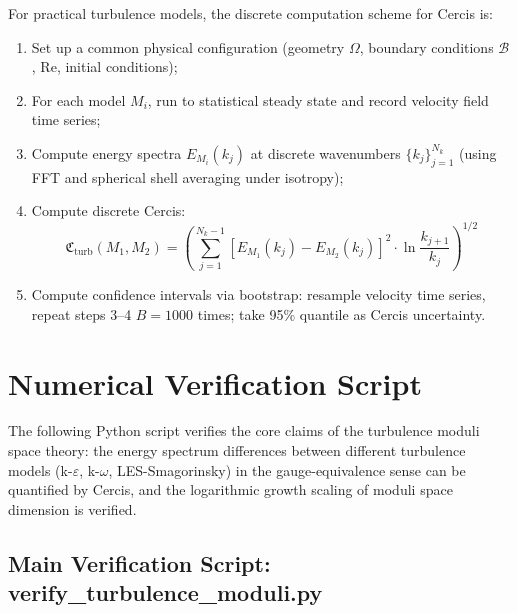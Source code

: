 \documentclass[12pt,a4paper]{article}
\theoremstyle{plain}
\theoremstyle{definition}
\theoremstyle{remark}
\newcommand{\cercis}{\mathfrak{C}}
\newcommand{\ReNum}{\mathrm{Re}}
\newcommand{\eps}{\varepsilon}
\begin{document}
For practical turbulence models, the discrete computation scheme for Cercis is:

\begin{enumerate}
    \item Set up a common physical configuration (geometry $\Omega$, boundary conditions $\mathcal{B}$, $\ReNum$, initial conditions);
    
    \item For each model $M_i$, run to statistical steady state and record velocity field time series;
    
    \item Compute energy spectra $E_{M_i}(k_j)$ at discrete wavenumbers $\{k_j\}_{j=1}^{N_k}$ (using FFT and spherical shell averaging under isotropy);
    
    \item Compute discrete Cercis:
    \begin{equation}
    \cercis_{\text{turb}}(M_1, M_2) = \left(\sum_{j=1}^{N_k-1} \left[E_{M_1}(k_j) - E_{M_2}(k_j)\right]^2 \cdot \ln\frac{k_{j+1}}{k_j}\right)^{1/2}
    \end{equation}
    
    \item Compute confidence intervals via bootstrap: resample velocity time series, repeat steps 3--4 $B=1000$ times; take 95\% quantile as Cercis uncertainty.
\end{enumerate}

\section{Numerical Verification Script}

The following Python script verifies the core claims of the turbulence moduli space theory: the energy spectrum differences between different turbulence models (k-$\eps$, k-$\omega$, LES-Smagorinsky) in the gauge-equivalence sense can be quantified by Cercis, and the logarithmic growth scaling of moduli space dimension is verified.

\subsection{Main Verification Script: verify\_turbulence\_moduli.py}
\end{document}
